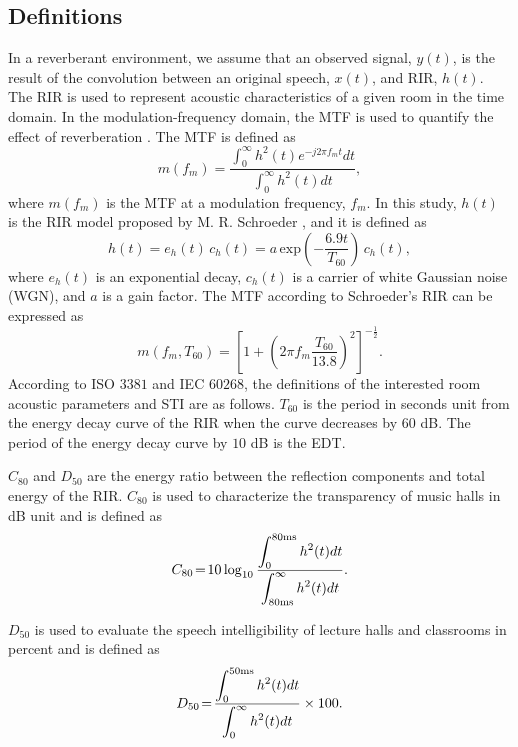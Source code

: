 \documentclass[conference]{IEEEtran}
\begin{document}
	\subsection{Definitions}
	In a reverberant environment, we assume that an observed signal, $y(t)$, is the result of the convolution between an original speech, $x(t)$, and RIR, $h(t)$. The RIR is used to represent acoustic characteristics of a given room in the time domain. In the modulation-frequency domain, the MTF is used to quantify the effect of reverberation \cite{Houtgast_Steeneken_MTF}. The MTF is defined as
	\begin{equation}
		m(f_m) = \displaystyle\frac{\displaystyle\int_{0}^{\infty} h^2(t)e^{-j2\pi{f_m}t}dt}{\displaystyle\int_{0}^{\infty} h^2(t)dt},
		\label{eq:MTF}
	\end{equation}
	where $m(f_m)$ is the MTF at a modulation frequency, $f_m$. In this study, $h(t)$ is the RIR model proposed by M. R. Schroeder \cite{SchroederRIR}, and it is defined as
	\begin{equation}
		h(t)\!=\!e_h(t)\,c_h(t)\!=\! a\,\text{exp}\left(-\frac{6.9t}{T_{60}}\right)\,c_h(t),
		\label{eq:schroederRIR}
	\end{equation}
	where $e_h(t)$ is an exponential decay, $c_h(t)$ is a carrier of white Gaussian noise (WGN), and $a$ is a gain factor. The MTF according to Schroeder's RIR can be expressed as
	\begin{equation}
		m(f_m, T_{{60}})= {\left[ 1+\left(2\pi f_m \frac{{T_{{60}}}}{13.8}\right)^2\right]}^{-{\frac{1}{2}}}.
		\label{eq:mtf_T60_k}
	\end{equation}
	According to ISO\,\,$3381$ and IEC\,\,$60268$, the definitions of the interested room acoustic parameters and STI are as follows. $T_{60}$ is the period in seconds unit from the energy decay curve of the RIR when the curve decreases by $60$ dB. The period of the energy decay curve by $10$ dB is the EDT.
	
	$C_{80}$ and $D_{50}$ are the energy ratio between the reflection components and total energy of the RIR. $C_{80}$ is used to characterize the transparency of music halls in dB unit and is defined as
	\begin{equation}
		C_{80}\!=\!10 \log_{10}\frac{\displaystyle\int_{0}^{80\rm{ms}} {h^2(t)} dt}{\displaystyle\int_{80\rm{ms}}^{\infty} { h^2(t)} dt}.
		\label{eq:C80}
	\end{equation}
	
	$D_{50}$ is used to evaluate the speech intelligibility of lecture halls and classrooms in percent and is defined as
	\begin{equation}
		D_{50}\!=\!\frac{\displaystyle\int_{0}^{\rm{50ms}} {h^2(t)} dt}{\displaystyle\int_{0}^{\infty} { h^2(t)} dt}\times 100.
		\label{eq:D50}
	\end{equation}
	
\end{document}
